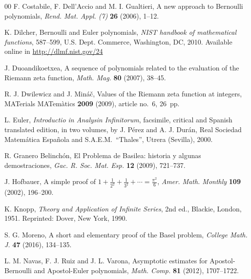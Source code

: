 \documentclass[11pt, oneside]{article}
\theoremstyle{plain}
\theoremstyle{definition}
\begin{document}
\begin{thebibliography}{00}
{F. Costabile, F. Dell'Accio and M. I. Gualtieri}, 
A new approach to Bernoulli polynomials, 
\textit{Rend. Mat. Appl. (7)}
\textbf{26} (2006), 1--12.

K. Dilcher,
{Bernoulli and Euler polynomials},
\textit{NIST handbook of mathematical functions},
587--599, %
U.S. Dept. Commerce, Washington, DC, 2010.
Available online in \url{http://dlmf.nist.gov/24}

J. Duoandikoetxea, 
A sequence of polynomials related to the evaluation of the Riemann zeta function, 
\textit{Math. Mag.} \textbf{80} (2007), 38--45. %

R. J. Dwilewicz and J. Min\'a\v{c},
Values of the Riemann zeta function at integers,
MATerials MATem\`atics \textbf{2009} (2009), article no.~6, 26~pp.

L. Euler, 
\textit{Introductio in Analysin Infinitorum}, 
facsimile, critical and Spanish translated edition, in two volumes,
by J. P\'erez and A. J. Dur\'an,
Real Sociedad Matem\'atica Espa\~nola and S.A.E.M.\ ``Thales'',
Utrera (Sevilla), 2000.

R. Granero Belinch\'on,
El Problema de Basilea: historia y algunas demostraciones,
\textit{Gac. R. Soc. Mat. Esp.} \textbf{12} (2009), 721--737. %

J. Hofbauer, 
{A simple proof of $1 + \frac{1}{2^2} + \frac{1}{3^2} + \cdots = \frac{\pi^2}{6}$}, 
\textit{Amer. Math. Monthly} \textbf{109} (2002), 196--200. %

K. Knopp, 
\textit{Theory and Application of Infinite Series}, 2nd ed.,
Blackie, London, 1951.
Reprinted: Dover, New York, 1990.

S. G. Moreno, 
A short and elementary proof of the Basel problem,
\textit{College Math. J.} \textbf{47} (2016), 134--135. %

L. M. Navas, F. J. Ruiz and J. L. Varona, 
{Asymptotic estimates for Apostol-Bernoulli and Apostol-Euler polynomials}, 
\textit{Math. Comp.} \textbf{81} (2012), 1707--1722. %


\end{thebibliography}
\end{document}

